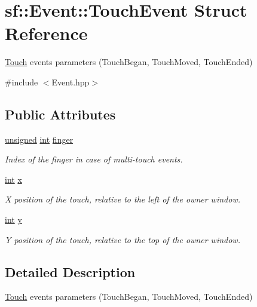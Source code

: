 \hypertarget{structsf_1_1_event_1_1_touch_event}{\section{sf\-:\-:Event\-:\-:Touch\-Event Struct Reference}
\label{structsf_1_1_event_1_1_touch_event}
}


\hyperlink{classsf_1_1_touch}{Touch} events parameters (Touch\-Began, Touch\-Moved, Touch\-Ended)  




{\ttfamily \#include $<$Event.\-hpp$>$}

\subsection*{Public Attributes}
\begin{DoxyCompactItemize}
\item 
\hyperlink{curses_8priv_8h_aca40206900cfc164654362fa8d4ad1e6}{unsigned} \hyperlink{term__entry_8h_ad65b480f8c8270356b45a9890f6499ae}{int} \hyperlink{structsf_1_1_event_1_1_touch_event_a9a79fe86bf9ac3c16ec7326f96feb61a}{finger}
\begin{DoxyCompactList}\small\item\em Index of the finger in case of multi-\/touch events. \end{DoxyCompactList}\item 
\hyperlink{term__entry_8h_ad65b480f8c8270356b45a9890f6499ae}{int} \hyperlink{structsf_1_1_event_1_1_touch_event_a8993963790b850caa68b98d3cad2be45}{x}
\begin{DoxyCompactList}\small\item\em X position of the touch, relative to the left of the owner window. \end{DoxyCompactList}\item 
\hyperlink{term__entry_8h_ad65b480f8c8270356b45a9890f6499ae}{int} \hyperlink{structsf_1_1_event_1_1_touch_event_add80639dc68bc37e3275744d501cdbe0}{y}
\begin{DoxyCompactList}\small\item\em Y position of the touch, relative to the top of the owner window. \end{DoxyCompactList}\end{DoxyCompactItemize}


\subsection{Detailed Description}
\hyperlink{classsf_1_1_touch}{Touch} events parameters (Touch\-Began, Touch\-Moved, Touch\-Ended) 

